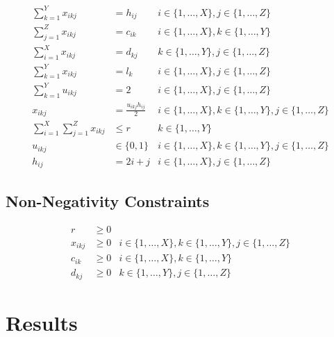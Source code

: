 \documentclass[12pt]{article} %
\begin{document}
\begin{align}
\label{eq:demand_flow_constraint}
\sum_{k = 1}^{Y} x_{ikj} &= h_{ij} & i \in \{1, \ldots, X\}, j \in \{1, \ldots, Z\} \\[1em]
\label{eq:source_capacity_constraint}
\sum_{j = 1}^{Z} x_{ikj} &= c_{ik} & i \in \{1, \ldots, X\}, k \in \{1, \ldots, Y\} \\[1em]
\label{eq:dest_capacity_constraint}
\sum_{i = 1}^{X} x_{ikj} &= d_{kj} & k \in \{1, \ldots, Y\}, j \in \{1, \ldots, Z\} \\[1em]
\label{eq:transit_link_capacity_constraint}
\sum_{k = 1}^{Y} x_{ikj} &= l_k & i \in \{1, \ldots, X\}, j \in \{1, \ldots, Z\} \\[1em]
\label{eq:binary_select_constraint}
\sum_{k = 1}^{Y} u_{ikj} &= 2 & i \in \{1, \ldots, X\}, j \in \{1, \ldots, Z\} \\[1em]
\label{eq:binary_constraint}
x_{ikj} &= \frac{u_{ikj}h_{ij}}{2} & i \in \{1, \ldots, X\}, k \in \{1, \ldots, Y\}, j \in \{1, \ldots, Z\} \\[1em]
\label{eq:decision_var_constraint}
\sum_{i = 1}^{X} \sum_{j = 1}^{Z} x_{ikj} &\leq r & k \in \{1, \ldots, Y\} \\[1em]
\label{eq:binary_definition}
u_{ikj} &\in \{0, 1\} & i \in \{1, \ldots, X\}, k \in \{1, \ldots, Y\}, j \in \{1, \ldots, Z\} \\[1em]
\label{eq:demand_definition}
h_{ij} &= 2i + j & i \in \{1, \ldots, X\}, j \in \{1, \ldots, Z\}
\end{align}

\subsection{Non-Negativity Constraints}

\begin{align}
\label{eq:obj_function_nn}
r &\geq 0 \\[1em]
\label{eq:decision_var_nn}
x_{ikj} &\geq 0 & i \in \{1, \ldots, X\}, k \in \{1, \ldots, Y\}, j \in \{1, \ldots, Z\} \\[1em]
\label{eq:source_capacity_nn}
c_{ik} &\geq 0 & i \in \{1, \ldots, X\}, k \in \{1, \ldots, Y\} \\[1em]
\label{eq:dest_capacity_nn}
d_{kj} &\geq 0 & k \in \{1, \ldots, Y\}, j \in \{1, \ldots, Z\}
\end{align}

\section{Results}
\end{document}
